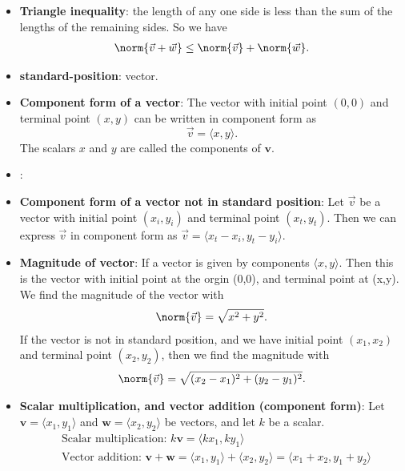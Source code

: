 \documentclass{report}
\begin{document}
\begin{itemize}
        \bigbreak \noindent 
    \item \textbf{Triangle inequality}: the length of any one side is less than the sum of the lengths of the remaining sides. So we have
        \begin{align*}
            \norm{\vec{v} + \vec{w}} \leq \norm{\vec{v}} + \norm{\vec{w}}
        .\end{align*}
    \item \textbf{standard-position}: vector.
    \item \textbf{Component form of a vector}:
        The vector with initial point $(0,0)$ and terminal point $(x,y)$ can be written in component form as
        \[
            \vec{v} = \langle x, y \rangle.
        \]
        The scalars $x$ and $y$ are called the components of $\mathbf{v}$.
    \item \textbf{}:
    \item \textbf{Component form of a vector not in standard position}: 
        Let $\vec{v}$ be a vector with initial point $(x_i, y_i)$ and terminal point $(x_t, y_t)$. Then we can express $\vec{v}$ in component form as $\vec{v} = \langle x_t - x_i, y_t - y_i \rangle.$
    \item \textbf{Magnitude of vector}: If a vector is given by components $\langle x,y \rangle $. Then this is the vector with initial point at the orgin (0,0), and terminal point at (x,y). We find the magnitude of the vector with
        \begin{align*}
            \norm{\vec{v}} = \sqrt{x^{2} + y^{2}}
        .\end{align*}
        If the vector is not in standard position, and we have initial point $(x_{1}, x_{2})$ and terminal point $(x_{2}, y_{2})$, then we find the magnitude with 
        \begin{align*}
            \norm{\vec{v}} = \sqrt{(x_{2} - x_{1})^{2} + (y_{2} - y_{1})^{2}}
        .\end{align*}
    \item \textbf{Scalar multiplication, and vector addition (component form)}:
        Let $\mathbf{v} = \langle x_1, y_1 \rangle$ and $\mathbf{w} = \langle x_2, y_2 \rangle$ be vectors, and let $k$ be a scalar.
        \begin{align*}
            &\text{Scalar multiplication: } k\mathbf{v} = \langle kx_1, ky_1 \rangle \\
            &\text{Vector addition: } \mathbf{v} + \mathbf{w} = \langle x_1, y_1 \rangle + \langle x_2, y_2 \rangle = \langle x_1 + x_2, y_1 + y_2 \rangle

\end{align*}
\end{itemize}
\end{document}
